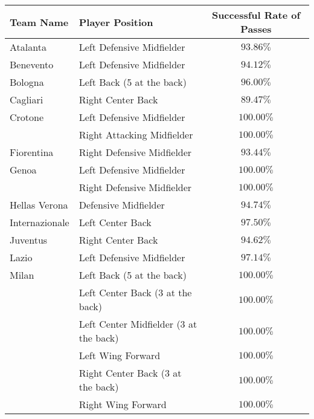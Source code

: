 \begin{table}[!htbp]
\centering
\begin{tabular}{l|l|c}
Team Name      & Player Position                        & Successful Rate of Passes \\
\hline
Atalanta       & Left Defensive Midfielder              & $93.86\%$                   \\
Benevento      & Left Defensive Midfielder              & $94.12\%$                   \\
Bologna        & Left Back (5 at the back)              & $96.00\%$                   \\
Cagliari       & Right Center Back                      & $89.47\%$                   \\
Crotone        & Left Defensive Midfielder              & $100.00\%$                  \\
       & Right Attacking Midfielder             & $100.00\%$                  \\
Fiorentina     & Right Defensive Midfielder             & $93.44\%$                   \\
Genoa          & Left Defensive Midfielder              & $100.00\%$                  \\
         & Right Defensive Midfielder             & $100.00\%$                  \\
Hellas Verona  & Defensive Midfielder                   & $94.74\%$                   \\
Internazionale & Left Center Back                       & $97.50\%$                  \\
Juventus       & Right Center Back                      & $94.62\%$                   \\
Lazio          & Left Defensive Midfielder              & $97.14\%$                   \\
Milan          & Left Back (5 at the back)              & $100.00\%$                  \\
        & Left Center Back (3 at the back)       & $100.00\%$                  \\
         & Left Center Midfielder (3 at the back) & $100.00\%$                  \\
        & Left Wing Forward                      & $100.00\%$                  \\
         & Right Center Back (3 at the back)      & $100.00\%$                  \\
        & Right Wing Forward                     & $100.00\%$                  \\

\end{tabular}
\end{table}
